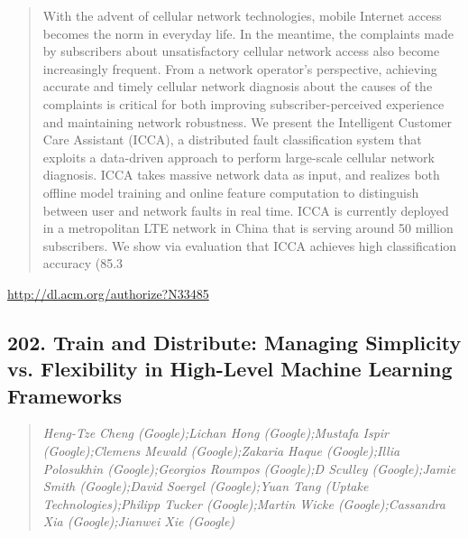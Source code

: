 \documentclass{article}
\begin{document}
\begin{quote}
With the advent of cellular network technologies, mobile Internet access becomes the norm in everyday life. In the meantime, the complaints made by subscribers about unsatisfactory cellular network access also become increasingly frequent. From a network operator’s perspective, achieving accurate and timely cellular network diagnosis about the causes of the complaints is critical for both improving subscriber-perceived experience and maintaining network robustness. We present the Intelligent Customer Care Assistant (ICCA), a distributed fault classification system that exploits a data-driven approach to perform large-scale cellular network diagnosis. ICCA takes massive network data as input, and realizes both offline model training and online feature computation to distinguish between user and network faults in real time. ICCA is currently deployed in a metropolitan LTE network in China that is serving around 50 million subscribers. We show via evaluation that ICCA achieves high classification accuracy (85.3%
\end{quote}

\href{http://dl.acm.org/authorize?N33485}{http://dl.acm.org/authorize?N33485}

\subsection{202. Train and Distribute: Managing Simplicity vs. Flexibility in High-Level Machine Learning Frameworks}

\begin{quote}
\footnotesize{\textit{Heng-Tze Cheng (Google);Lichan Hong (Google);Mustafa Ispir (Google);Clemens Mewald (Google);Zakaria Haque (Google);Illia Polosukhin (Google);Georgios Roumpos (Google);D Sculley (Google);Jamie Smith (Google);David Soergel (Google);Yuan Tang (Uptake Technologies);Philipp Tucker (Google);Martin Wicke (Google);Cassandra Xia (Google);Jianwei Xie (Google)}}

\end{quote}
\end{document}
